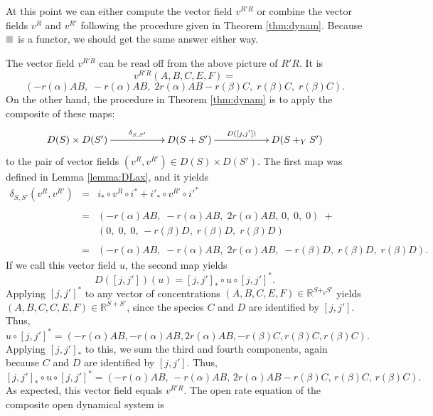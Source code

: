 \documentclass{compositionalityarticle}
\newcommand{\R}{\mathbb{R}}
\newcommand*{\graysquare}{\textcolor{lightgray}{\blacksquare}}
\theoremstyle{compositionality}
\theoremstyle{remark}
\begin{document}
At this point we can either compute the vector field $v^{R'R}$ or combine the vector fields $v^R$ and $v^{R'}$ following the procedure given in Theorem \ref{thm:dynam}.  Because $\graysquare$ is a functor, we should get the same answer either way.

The vector field $v^{R'R}$ can be read off from the above picture of $R'R$.  It is
\begin{equation}
\label{eq:v_3}
     v^{R'R}(A,B,C,E,F) = 
\end{equation}
\[
(-r(\alpha) A B, \; -r(\alpha) A B, \; 2 r(\alpha) AB - r(\beta) C, \; r(\beta) C, \; r(\beta) C ) .
\]
On the other hand, the procedure in Theorem \ref{thm:dynam} is to apply the composite of these maps:
\[      
\xymatrix{      D(S) \times D(S') \ar[rr]^-{\delta_{S,S'}} && 
                     D(S + S') \ar[rr]^-{D([j,j'])} && D(S +_Y S') } \]
to the pair of vector fields $(v^R,v^{R'}) \in D(S) \times D(S')$.    The first map
was defined in Lemma \ref{lemma:DLax}, and it yields
\[   \begin{array}{ccl}
  \delta_{S,S'}(v^R,v^{R'}) &=& i_* \circ v^R \circ i^* + i'_* \circ v^{R'} \circ {i'}^* \\  \\
&=&  ( -r(\alpha) AB, \; -r(\alpha) AB , \; 2r(\alpha) AB, \, 0, \; 0, \; 0) \; + \\ 
&& (0, \; 0,\; 0,\, -r(\beta) D , \;r(\beta) D , \; r(\beta) D) \\ \\
&=& ( -r(\alpha) AB,\; -r(\alpha) AB ,\; 2r(\alpha) AB, \; -r(\beta) D , \; r(\beta) D ,\; r(\beta) D).
\end{array}
\]
If we call this vector field $u$, the second map yields
\[  D([j,j'])(u) = [j,j']_* \circ u \circ [j,j']^*.\]
Applying $[j,j']^*$ to any vector of concentrations $(A,B,C,E,F) \in \R^{S +_Y S'}$ yields
$(A,B,C,C,E,F) \in \R^{S+S'}$, since the species $C$ and $D$ are identified by $[j,j']$.   Thus, 
\[   u \circ [j,j']^* =  ( -r(\alpha) AB, -r(\alpha) AB , 2r(\alpha) AB, -r(\beta) C , r(\beta) C , r(\beta) C). \]
Applying $[j,j']_*$ to this, we sum the third and fourth components, again because $C$
and $D$ are identified by $[j,j']$.  Thus,
\[   [j,j']_* \circ u \circ [j,j']^* =  ( -r(\alpha) AB, \, -r(\alpha) AB , \, 2r(\alpha) AB -r(\beta) C , \, r(\beta) C , \, r(\beta) C). \]
As expected, this vector field equals $v^{R'R}$.     The open rate equation of the composite open dynamical system is
\end{document}

